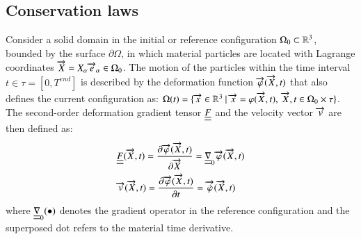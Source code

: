 \subsection{Conservation laws}
Consider a solid domain in the initial or reference configuration $\Omega_0 \subset \mathbb{R}^3$, bounded by the surface $\partial \Omega$, in which material particles are located with Lagrange coordinates ${\overrightarrow{X}}=X_\alpha{\overrightarrow{e}}_\alpha \in \Omega_0$.
The motion of the particles within the time interval $t\in\tau= [0,T^{end}]$ is described by the deformation function ${\overrightarrow{\varphi}}({\overrightarrow{X}},t)$ that also defines the current configuration as: $\Omega(t)=\{{\overrightarrow{x}} \in \mathbb{R}^3 \: \lvert \: {\overrightarrow{x}}=\varphi({\overrightarrow{X}},t), \:{\overrightarrow{X}},t \in \Omega_0\times\tau\}$.
The second-order deformation gradient tensor ${\underline{\underline{F}}}$ and the velocity vector ${\overrightarrow{v}}$ are then defined as:
\begin{align}
  \label{eq:deformation_gradient}
  &{\underline{\underline{F}}}({\overrightarrow{X}},t) = \frac{\partial {\overrightarrow{\varphi}}({\overrightarrow{X}},t)}{\partial {\overrightarrow{X}}} = {\underline{\underline{\nabla}}}_0 {\overrightarrow{\varphi}}({\overrightarrow{X}},t) \\
  \label{eq:velocity}
  & {\overrightarrow{v}}({\overrightarrow{X}},t)= \frac{\partial {\overrightarrow{\varphi}}({\overrightarrow{X}},t)}{\partial t} = {\overrightarrow{\dot{\varphi}}}({\overrightarrow{X}},t)
\end{align}
where ${\underline{\underline{\nabla}}}_{0}(\bullet)$ denotes the gradient operator in the reference configuration and the superposed dot refers to the material time derivative.

